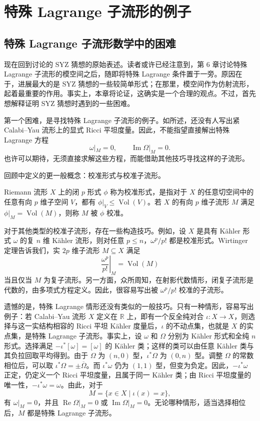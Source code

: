\section{特殊 Lagrange 子流形的例子}\label{sec:7.2}
\subsection{特殊 Lagrange 子流形数学中的困难}\label{sec:7.2.1}

现在回到讨论的 SYZ 猜想的原始表述。读者或许已经注意到，第 6 章讨论特殊 Lagrange 子流形的模空间之后，随即将特殊 Lagrange 条件置于一旁。原因在于，进展最大的是 SYZ 猜想的一些较简单形式；在那里，模空间作为仿射流形，起着最重要的作用。事实上，本章将论证，这确实是一个合理的观点。不过，首先想解释证明 SYZ 猜想时遇到的一些困难。

第一个困难，是寻找特殊 Lagrange 子流形的例子。如所述，还没有人写出紧 Calabi--Yau 流形上的显式 Ricci 平坦度量。因此，不能指望直接解出特殊 Lagrange 方程
\[
\omega|_M=0,\qquad\operatorname{Im}\Omega|_M=0.
\]
也许可以期待，无须直接求解这些方程，而能借助其他技巧寻找这样的子流形。

回顾中定义的更一般概念：校准形式与校准子流形。
\begin{definition*}
Riemann 流形 $X$ 上的闭 $p$ 形式 $\phi$ 称为校准形式，是指对于 $X$ 的任意切空间中的任意有向 $p$ 维子空间 $V$，都有 $\phi|_V\leq\operatorname{Vol}(V)$。若 $X$ 的有向 $p$ 维子流形 $M$ 满足 $\phi|_M=\operatorname{Vol}(M)$，则称 $M$ 被 $\phi$ 校准。
\end{definition*}

对于其他类型的校准子流形，存在一些构造技巧。例如，设 $X$ 是具有 Kähler 形式 $\omega$ 的复 $n$ 维 Kähler 流形，则对任意 $p\leq n$，$\omega^p/p!$ 都是校准形式。Wirtinger 定理告诉我们，实 $2p$ 维子流形 $M\subseteq X$ 满足
\[
\left.\frac{\omega^p}{p!}\right|_M=\operatorname{Vol}(M)
\]
当且仅当 $M$ 为复子流形。另一方面，众所周知，在射影代数情形，闭复子流形是代数的，由多项式方程定义。因此，很容易写出被 $\omega^p/p!$ 校准的子流形。

遗憾的是，特殊 Lagrange 情形还没有类似的一般技巧。只有一种情形，容易写出例子：若 Calabi--Yau 流形 $X$ 定义在 $\mathbb R$ 上，即有一个反全纯对合 $\iota\colon X\to X$，则选择与这一实结构相容的 Ricci 平坦 Kähler 度量后，$\iota$ 的不动点集，也就是 $X$ 的实点集，是特殊 Lagrange 子流形。事实上，设 $\omega$ 和 $\Omega$ 分别为 Kähler 形式和全纯 $n$ 形式。选择满足 $-\iota^*[\omega]=[\omega]$ 的 Kähler 类；这样的类可以由任意 Kähler 类与其负拉回取平均得到。由于 $\Omega$ 为 $(n,0)$ 型，$\iota^*\Omega$ 为 $(0,n)$ 型。调整 $\Omega$ 的常数相位后，可以取 $\iota^*\Omega=\pm\overline\Omega$。而 $\iota^*\omega$ 仍为 $(1,1)$ 型，但变为负定。因此，$-\iota^*\omega$ 正定，仍定义一个 Ricci 平坦度量，且属于同一 Kähler 类；由 Ricci 平坦度量的唯一性，$-\iota^*\omega=\omega$。由此，对于
\[
M=\{x\in X\mid\iota(x)=x\},
\]
有 $\omega|_M=0$，并且 $\operatorname{Re}\Omega|_M=0$ 或 $\operatorname{Im}\Omega|_M=0$。无论哪种情形，适当选择相位后，$M$ 都是特殊 Lagrange 子流形。

